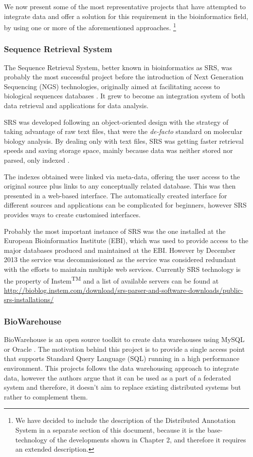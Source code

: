 We now present some of the most representative projects that have attempted to integrate data and offer a solution for this requirement in the bioinformatics field, by using one or more of the aforementioned approaches. \footnote{We have decided to include the description of the Distributed Annotation System in a separate section of this document, because it is the base-technology of the developments shown in Chapter 2, and therefore it requires an extended description.}

\subsubsection{Sequence Retrieval System}
The Sequence Retrieval System, better known in bioinformatics as SRS, was probably the most successful project before the introduction of Next Generation Sequencing (NGS) technologies, originally aimed at facilitating access to biological sequences databases \cite{ETZ1996}. It grew to become an integration system of both data retrieval and applications for data analysis.

SRS was developed following an object-oriented design with the strategy of taking advantage of raw text files, that were the \emph{de-facto} standard on molecular biology analysis. By dealing only with text files, SRS was getting faster retrieval speeds and saving storage space, mainly because data was neither stored nor parsed, only indexed \cite{ZDO2002}.

The  indexes obtained were linked via meta-data, offering the user access to the original source plus links to any conceptually related database. This was then presented in a web-based interface. The automatically created interface for different sources and applications can be complicated for beginners, however SRS provides ways to create customised interfaces.

Probably the most important instance of SRS was the one installed at the European Bioinformatics Institute (EBI), which was used to provide access to the major databases produced and maintained at the EBI. However by December 2013 the service was decommissioned as the service was considered redundant with the efforts to maintain multiple web services. Currently SRS technology is the property of Instem\textsuperscript{TM} and a list of available servers can be found at \url{http://bioblog.instem.com/download/srs-parser-and-software-downloads/public-srs-installations/}

\subsubsection{BioWarehouse}
BioWarehouse is an open source toolkit to create data warehouses using MySQL or Oracle \cite{LEE2006}. The motivation behind this project is to provide  a single access point that supports Standard Query Language (SQL) running in a high performance environment.
This projects follows the data warehousing approach to integrate data, however the authors argue that it can be used as a part of a federated system and therefore, it doesn't aim to replace existing distributed systems but rather to complement them.

